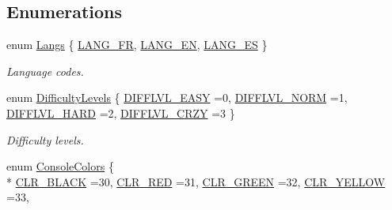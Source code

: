 \subsection*{Enumerations}
\begin{DoxyCompactItemize}
\item 
enum \hyperlink{namespace_chase_game_a2501a45afa3eb11b10e04d79a8349796}{Langs} \{ \hyperlink{namespace_chase_game_a2501a45afa3eb11b10e04d79a8349796a4259ad53ebc5f91f2615cf5a5f59bece}{L\-A\-N\-G\-\_\-\-F\-R}, 
\hyperlink{namespace_chase_game_a2501a45afa3eb11b10e04d79a8349796a8d86c92b659a6ebac045d0a20e3fba0d}{L\-A\-N\-G\-\_\-\-E\-N}, 
\hyperlink{namespace_chase_game_a2501a45afa3eb11b10e04d79a8349796a2458ded06b17611b5fb00d6a095a4dd2}{L\-A\-N\-G\-\_\-\-E\-S}
 \}
\begin{DoxyCompactList}\small\item\em Language codes. \end{DoxyCompactList}\item 
enum \hyperlink{namespace_chase_game_a5d785ea23167a3b7e44e045097cd457e}{Difficulty\-Levels} \{ \hyperlink{namespace_chase_game_a5d785ea23167a3b7e44e045097cd457ea8511737cb33e0a6022084ed1b5c05092}{D\-I\-F\-F\-L\-V\-L\-\_\-\-E\-A\-S\-Y} =0, 
\hyperlink{namespace_chase_game_a5d785ea23167a3b7e44e045097cd457ea124bdf49731fecdaa92d39fbd9d98f26}{D\-I\-F\-F\-L\-V\-L\-\_\-\-N\-O\-R\-M} =1, 
\hyperlink{namespace_chase_game_a5d785ea23167a3b7e44e045097cd457ea67fccff53bbaeaa47737530842f5c4f5}{D\-I\-F\-F\-L\-V\-L\-\_\-\-H\-A\-R\-D} =2, 
\hyperlink{namespace_chase_game_a5d785ea23167a3b7e44e045097cd457ea6c71b45deb89801d0e11e674d21e3e51}{D\-I\-F\-F\-L\-V\-L\-\_\-\-C\-R\-Z\-Y} =3
 \}
\begin{DoxyCompactList}\small\item\em Difficulty levels. \end{DoxyCompactList}\item 
enum \hyperlink{namespace_chase_game_a5acdf639e912d1e78814b7fae21afc7b}{Console\-Colors} \{ \\*
\hyperlink{namespace_chase_game_a5acdf639e912d1e78814b7fae21afc7ba7c17af5d1ff079f2a505dd61f9e1ddae}{C\-L\-R\-\_\-\-B\-L\-A\-C\-K} =30, 
\hyperlink{namespace_chase_game_a5acdf639e912d1e78814b7fae21afc7baea24ff932a53ca9fd904e2b607407c0a}{C\-L\-R\-\_\-\-R\-E\-D} =31, 
\hyperlink{namespace_chase_game_a5acdf639e912d1e78814b7fae21afc7ba9f550f868a825b9a3be5a7d0dbcc4852}{C\-L\-R\-\_\-\-G\-R\-E\-E\-N} =32, 
\hyperlink{namespace_chase_game_a5acdf639e912d1e78814b7fae21afc7ba9ac15128d0c53aad431c8d1da78cf17a}{C\-L\-R\-\_\-\-Y\-E\-L\-L\-O\-W} =33, 

\end{DoxyCompactItemize}
